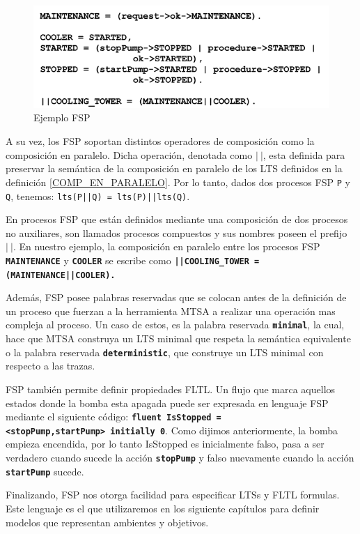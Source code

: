 \begin{figure}
    \centering
    \includegraphics[scale=0.50]{img/FSP.png}
    \caption{Ejemplo FSP}
    \label{FSP}
\end{figure}

A su vez, los FSP soportan distintos operadores de composición como la composición en paralelo. Dicha operación,
denotada como $|\ |$, esta definida para preservar la semántica de la composición en paralelo de los LTS definidos en la
definición \ref{COMP_EN_PARALELO}. Por lo tanto, dados dos procesos FSP \texttt{P} y \texttt{Q}, tenemos:
\texttt{lts(P||Q) = lts(P)||lts(Q)}.

En procesos FSP que están definidos mediante una composición de dos procesos no auxiliares, son llamados procesos
compuestos y sus nombres poseen el prefijo $|\ |$. En nuestro ejemplo, la composición en paralelo entre los procesos FSP 
\texttt{\textbf{MAINTENANCE}} y \texttt{\textbf{COOLER}} se escribe como \texttt{\textbf{||COOLING\_TOWER =
(MAINTENANCE||COOLER).}}

Además, FSP posee palabras reservadas que se colocan antes de la definición de un proceso que fuerzan a la herramienta
MTSA a realizar una operación mas compleja al proceso. Un caso de estos, es la palabra reservada
\texttt{\textbf{minimal}}, la cual, hace que MTSA construya un LTS minimal que respeta la semántica equivalente o la
palabra reservada \texttt{\textbf{deterministic}}, que construye un LTS minimal con respecto a las trazas.

FSP también permite definir propiedades FLTL. Un flujo que marca aquellos estados donde la bomba esta apagada puede ser
expresada en lenguaje FSP mediante el siguiente código: \texttt{\textbf{fluent IsStopped = <stopPump,startPump>\ initially 0}}.
Como dijimos anteriormente, la bomba empieza encendida, por lo tanto IsStopped es inicialmente falso, pasa a ser
verdadero cuando sucede la acción \texttt{\textbf{stopPump}} y falso nuevamente cuando la acción \texttt{\textbf{startPump}} sucede.

Finalizando, FSP nos otorga facilidad para especificar LTSs y FLTL formulas. Este lenguaje es el que utilizaremos en los
siguiente capítulos para definir modelos que representan ambientes y objetivos. 
